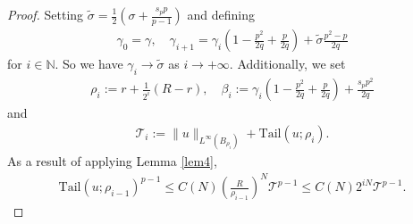 \documentclass[reqno,10pt]{amsart}
\numberwithin{equation}{section}
\begin{document}
\begin{proof}
	Setting $\tilde{\sigma}=\frac{1}{2}\left(\sigma+\frac{s_p p}{p-1}\right)$ and defining
	\begin{align*}
		\gamma_0=\gamma,\quad \gamma_{i+1}=\gamma_i\left(1-\frac{p^2}{2 q}+\frac{p}{2 q}\right)+\tilde{\sigma}  \frac{p^2-p}{2 q}
	\end{align*}
	for $i\in\mathbb{N}$. So we have $\gamma_i\rightarrow\tilde{\sigma}$ as $i\rightarrow+\infty$. Additionally, we set
	\begin{align*}
		\rho_i:=r+\frac{1}{2^i}(R-r), \quad \beta_i:=\gamma_i\left(1-\frac{p^2}{2 q}+\frac{p}{2 q}\right)+\frac{s_p p^2}{2 q}
	\end{align*}
	and 
	\begin{align*}
		\mathcal{T}_i:=\|u\|_{L^{\infty}\left(B_{\rho_i}\right)}+\mathrm{Tail} \left(u ; \rho_i\right) .
	\end{align*}
	As a result of applying Lemma \ref{lem4},
	\begin{align}\label{12.1}
		\mathrm { Tail }\left(u ; \rho_{i-1}\right)^{p-1} \leq C(N)\left(\frac{R}{\rho_{i-1}}\right)^N \mathcal{T}^{p-1} \leq C(N)  2^{i N} \mathcal{T}^{p-1}.
	\end{align}


\end{proof}
\end{document}
